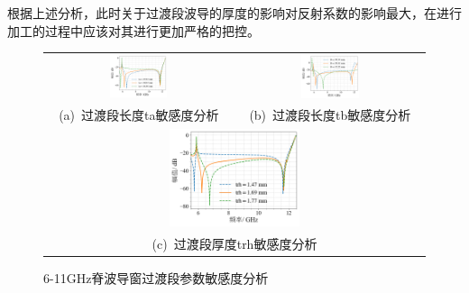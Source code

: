 \documentclass[master]{thesis-uestc}
\begin{document}
根据上述分析，此时关于过渡段波导的厚度的影响对反射系数的影响最大，在进行加工的过程中应该对其进行更加严格的把控。
\begin{figure}[!htbp]
    \small
    \centering
    \begin{tabular}{@{\ }c@{\ }c}
        \includegraphics[width=0.32\textwidth]{pic/chapter3/脊波导窗过渡段长度ta扫参.png} & 
        \hspace{5pt}
        \includegraphics[width=0.32\textwidth]{pic/chapter3/脊波导窗过渡段宽度tb扫参.png}     \\
        \mbox{\small (a) 过渡段长度ta敏感度分析}                                                                               & 
        \mbox{\small (b) 过渡段长度tb敏感度分析}                                                                                  \\[6bp]
        \multicolumn{2}{c}{\includegraphics[width=0.35\textwidth]{pic/chapter3/脊波导窗过渡段厚度trh扫参.png}} \\  %
        \multicolumn{2}{c}{\mbox{\small (c) 过渡段厚度trh敏感度分析}}
    \end{tabular}
    \caption{6-11GHz脊波导窗过渡段参数敏感度分析}
    \label{fig:X频段脊波导窗过渡段参数敏感度分析}
\end{figure}
\end{document}
